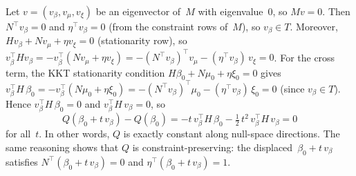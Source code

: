 \begin{remark}%
\label{rem:v2-null-q-constant}
Let $v = (v_\beta, v_\mu, v_\xi)$ be an eigenvector of~$M$
with eigenvalue~$0$, so $Mv = 0$.
Then $N^\top v_\beta = 0$ and $\eta^\top v_\beta = 0$
(from the constraint rows of~$M$),
so $v_\beta \in T$.
Moreover, $H v_\beta + N v_\mu + \eta v_\xi = 0$
(stationarity row), so
$v_\beta^\top H v_\beta
  = -v_\beta^\top(N v_\mu + \eta v_\xi)
  = -(N^\top v_\beta)^\top v_\mu
    - (\eta^\top v_\beta)\,v_\xi = 0$.
For the cross term, the KKT stationarity condition
$H\beta_0 + N\mu_0 + \eta\xi_0 = 0$ gives
$v_\beta^\top H\,\beta_0
  = -v_\beta^\top(N\mu_0 + \eta\xi_0)
  = -(N^\top v_\beta)^\top\mu_0
    - (\eta^\top v_\beta)\,\xi_0 = 0$
(since $v_\beta \in T$).
Hence $v_\beta^\top H\,\beta_0 = 0$
and $v_\beta^\top H\,v_\beta = 0$, so
\[
  Q(\beta_0 + t\,v_\beta) - Q(\beta_0)
  = -t\,v_\beta^\top H\,\beta_0
    - \tfrac{1}{2}\,t^2\,v_\beta^\top H\,v_\beta
  = 0
\]
for all~$t$.
In other words, $Q$ is exactly constant along
null-space directions.
The same reasoning shows that $Q$ is
constraint-preserving:
the displaced~$\beta_0 + t\,v_\beta$ satisfies
$N^\top(\beta_0 + t\,v_\beta) = 0$ and
$\eta^\top(\beta_0 + t\,v_\beta) = 1$.
\end{remark}


